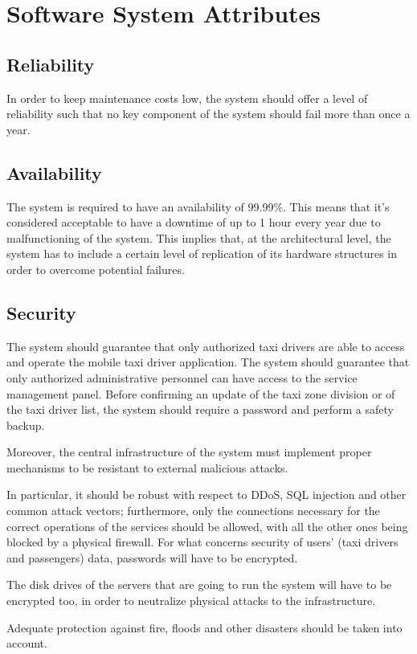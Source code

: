 \section{Software System Attributes}
\subsection{Reliability}
In order to keep maintenance costs low, the system should offer a level of reliability such that no key component of the system should fail more than once a year.


\subsection{Availability}
The system is required to have an availability of 99.99\%. This means that it's considered acceptable to have a downtime of up to 1 hour every year due to malfunctioning of the system. This implies that, at the architectural level, the system has to include a certain level of replication of its hardware structures in order to overcome potential failures.


\subsection{Security}
The system should guarantee that only authorized taxi drivers are able to access and operate the mobile taxi driver application. The system should guarantee that only authorized administrative personnel can have access to the service management panel. Before confirming an update of the taxi zone division or of the taxi driver list, the system should require a password and perform a safety backup.

Moreover, the central infrastructure of the system must implement proper mechanisms to be resistant to external malicious attacks.

In particular, it should be robust with respect to DDoS, SQL injection and other common attack vectors; furthermore, only the connections necessary for the correct operations of the services should be allowed, with all the other ones being blocked by a physical firewall.
For what concerns security of users' (taxi drivers and passengers) data, passwords will have to be encrypted.

The disk drives of the servers that are going to run the system will have to be encrypted too, in order to neutralize physical attacks to the infrastructure.

Adequate protection against fire, floods and other disasters should be taken into account.


